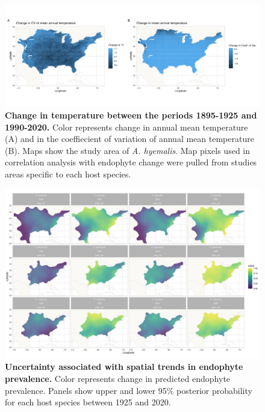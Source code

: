 \documentclass[11pt]{article}
\begin{document}
	
	\begin{figure}[H]
		\centering
		\includegraphics[width = \linewidth]{tmean_change_maps.png}
		\caption{\textbf{Change in temperature between the periods 1895-1925 and 1990-2020.} Color represents change in annual mean temperature (A) and in the coeffiecient of variation of annual mean temperature (B). Maps show the study area of \emph{A. hyemalis}. Map pixels used in correlation analysis with endophyte change were pulled from studies areas specific to each host species.}
	\end{figure}



\begin{figure}[H]
	\centering
	\includegraphics[width = \linewidth]{prevalence_map_CI.png}
	\caption{\textbf{Uncertainty associated with spatial trends in endophyte prevalence.} Color represents change in predicted endophyte prevalence. Panels show upper and lower 95\% posterior probability for each host species between 1925 and 2020.}
\end{figure}
\end{document}
